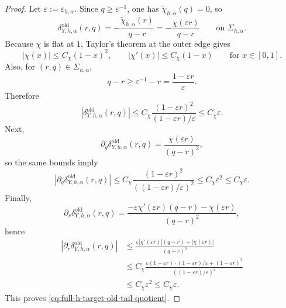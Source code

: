 \documentclass[11pt,a4paper]{amsart}
\theoremstyle{plain}
\theoremstyle{definition}
\theoremstyle{remark}
\begin{document}
\begin{proof}
Let \(\varepsilon:=\varepsilon_{h,\alpha}\). Since \(q\ge \varepsilon^{-1}\), one has
\(\widetilde\chi_{h,\alpha}(q)=0\), so
\[
\delta_{Y,h,\alpha}^{\mathrm{old}}(r,q)
=
-\frac{\widetilde\chi_{h,\alpha}(r)}{q-r}
=
-\frac{\chi(\varepsilon r)}{q-r}
\qquad\text{on }\Sigma_{h,\alpha}.
\]
Because \(\chi\) is flat at \(1\), Taylor's theorem at the outer edge gives
\[
|\chi(x)|\le C_\chi(1-x)^2,
\qquad
|\chi'(x)|\le C_\chi(1-x)
\qquad\text{for }x\in[0,1].
\]
Also, for \((r,q)\in\Sigma_{h,\alpha}\),
\[
q-r\ge \varepsilon^{-1}-r=\frac{1-\varepsilon r}{\varepsilon}.
\]
Therefore
\[
\left|
\delta_{Y,h,\alpha}^{\mathrm{old}}(r,q)
\right|
\le
C_\chi
\frac{(1-\varepsilon r)^2}{(1-\varepsilon r)/\varepsilon}
\le
C_\chi \varepsilon.
\]
Next,
\[
\partial_q\delta_{Y,h,\alpha}^{\mathrm{old}}(r,q)
=
\frac{\chi(\varepsilon r)}{(q-r)^2},
\]
so the same bounds imply
\[
\left|
\partial_q\delta_{Y,h,\alpha}^{\mathrm{old}}(r,q)
\right|
\le
C_\chi
\frac{(1-\varepsilon r)^2}{((1-\varepsilon r)/\varepsilon)^2}
\le
C_\chi \varepsilon^2
\le
C_\chi \varepsilon.
\]
Finally,
\[
\partial_r\delta_{Y,h,\alpha}^{\mathrm{old}}(r,q)
=
\frac{-\varepsilon\chi'(\varepsilon r)(q-r)-\chi(\varepsilon r)}{(q-r)^2},
\]
hence
\begin{align*}
\left|
\partial_r\delta_{Y,h,\alpha}^{\mathrm{old}}(r,q)
\right|
&\le
\frac{
\varepsilon |\chi'(\varepsilon r)|(q-r)+|\chi(\varepsilon r)|
}{(q-r)^2}\\
&\le
C_\chi
\frac{
\varepsilon(1-\varepsilon r)\cdot (1-\varepsilon r)/\varepsilon
+(1-\varepsilon r)^2
}{
((1-\varepsilon r)/\varepsilon)^2
}\\
&\le
C_\chi \varepsilon^2
\le
C_\chi \varepsilon.
\end{align*}
This proves \eqref{eq:full-h-target-old-tail-quotient}.
\end{proof}
\end{document}
